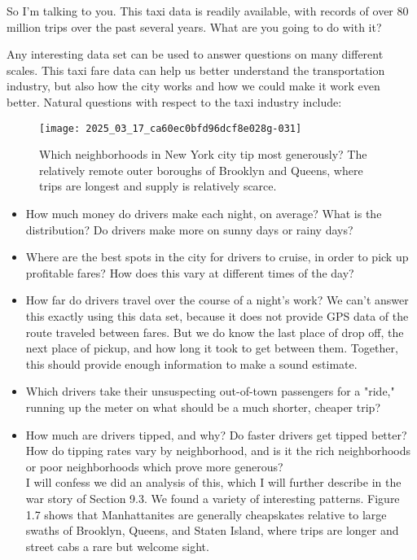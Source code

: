 \documentclass[10pt]{article}
\begin{document}
So I'm talking to you. This taxi data is readily available, with records of over 80 million trips over the past several years. What are you going to do with it?

Any interesting data set can be used to answer questions on many different scales. This taxi fare data can help us better understand the transportation industry, but also how the city works and how we could make it work even better. Natural questions with respect to the taxi industry include:

\begin{figure}[H]
\centering
\texttt{[image: 2025\_03\_17\_ca60ec0bfd96dcf8e028g-031]}
\caption{Which neighborhoods in New York city tip most generously? The relatively remote outer boroughs of Brooklyn and Queens, where trips are longest and supply is relatively scarce.}
\end{figure}

\begin{itemize}
  \item How much money do drivers make each night, on average? What is the distribution? Do drivers make more on sunny days or rainy days?
  \item Where are the best spots in the city for drivers to cruise, in order to pick up profitable fares? How does this vary at different times of the day?
  \item How far do drivers travel over the course of a night's work? We can't answer this exactly using this data set, because it does not provide GPS data of the route traveled between fares. But we do know the last place of drop off, the next place of pickup, and how long it took to get between them. Together, this should provide enough information to make a sound estimate.
  \item Which drivers take their unsuspecting out-of-town passengers for a "ride," running up the meter on what should be a much shorter, cheaper trip?
  \item How much are drivers tipped, and why? Do faster drivers get tipped better? How do tipping rates vary by neighborhood, and is it the rich neighborhoods or poor neighborhoods which prove more generous?\\
  I will confess we did an analysis of this, which I will further describe in the war story of Section 9.3. We found a variety of interesting patterns. Figure 1.7 shows that Manhattanites are generally cheapskates relative to large swaths of Brooklyn, Queens, and Staten Island, where trips are longer and street cabs a rare but welcome sight.
\end{itemize}
\end{document}
